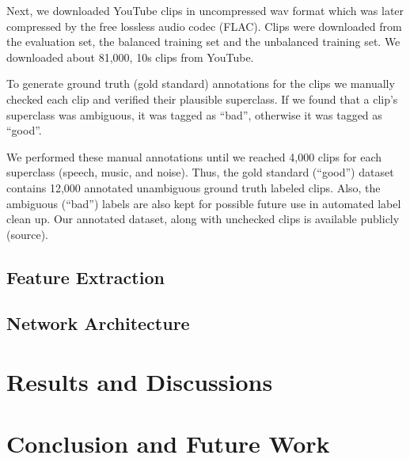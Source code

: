 \documentclass{article}
\begin{document}
Next, we downloaded YouTube clips in uncompressed wav format which was later compressed by the free lossless audio codec (FLAC). Clips were downloaded from the evaluation set, the balanced training set and the unbalanced training set. We downloaded about 81,000, 10s clips from YouTube.  

To generate ground truth (gold standard) annotations for the clips we manually checked each clip and verified their plausible superclass. If we found that a clip’s superclass was ambiguous, it was tagged as “bad”, otherwise it was tagged as “good”.  

We performed these manual annotations until we reached 4,000 clips for each superclass (speech, music, and noise). Thus, the gold standard (“good”) dataset contains 12,000 annotated unambiguous ground truth labeled clips. Also, the ambiguous (“bad”) labels are also kept for possible future use in automated label clean up. Our annotated dataset, along with unchecked clips is available publicly (source). 

\subsection{Feature Extraction}

\subsection{Network Architecture}

\section{Results and Discussions}





\section{Conclusion and Future Work}


\printbibliography
\end{document}
